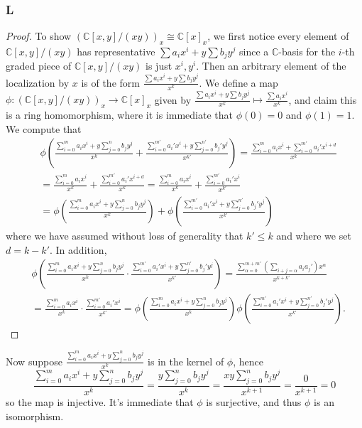 \documentclass{article}
\newcommand{\C}{\mathbb{C}}
\begin{document}
\subsubsection{L}\label{3.2.L}
\begin{proof}
    To show $(\C[x,y]/(xy))_x\cong \C[x]_x$, we first notice every element of $\C[x,y]/(xy)$ has representative $\sum a_i x^i+ y \sum b_j y^j$ since a $\C$-basis for the $i$-th graded piece of $\C[x,y]/(xy)$ is just $x^i,y^i$. Then an arbitrary element of the localization by $x$ is of the form $\frac{\sum a_i x^i+ y \sum b_j y^j}{x^k}$. We define a map $\phi:(\C[x,y]/(xy))_x\to \C[x]_x$ given by $\frac{\sum a_i x^i+ y \sum b_j y^j}{x^k}\mapsto \frac{\sum a_i x^i}{x^k}$, and claim this is a ring homomorphism, where it is immediate that $\phi(0)=0$ and $\phi(1)=1$. We compute that
    \begin{align*}
        &\phi(\frac{\sum_{i=0}^m a_i x^i+ y \sum_{j=0}^n b_j y^j}{x^k}+\frac{\sum_{i=0}^{m'} a_i' x^i+ y \sum_{j=0}^{n'} b_j' y^j}{x^{k'}})=\frac{\sum_{i=0}^m a_i x^i+\sum_{i=0}^{m'}a_i'x^{i+d}}{x^k}\\
        &=\frac{\sum_{i=0}^m a_i x^i}{x^k}+\frac{\sum_{i=0}^{m'}a_i'x^{i+d}}{x^k}=\frac{\sum_{i=0}^m a_i x^i}{x^k}+\frac{\sum_{i=0}^{m'}a_i'x^{i}}{x^{k'}}\\
        &=\phi(\frac{\sum_{i=0}^m a_i x^i+ y \sum_{j=0}^n b_j y^j}{x^k})+\phi(\frac{\sum_{i=0}^{m'} a_i' x^i+ y \sum_{j=0}^{n'} b_j' y^j}{x^{k'}})
    \end{align*}
    where we have assumed without loss of generality that $k'\le k$ and where we set $d=k-k'$. In addition,
    \begin{align*}
        &\phi(\frac{\sum_{i=0}^m a_i x^i+ y \sum_{j=0}^n b_j y^j}{x^k} \cdot \frac{\sum_{i=0}^{m'} a_i' x^i+ y \sum_{j=0}^{n'} b_j' y^j}{x^{k'}})=\frac{\sum_{\alpha=0}^{m+m'} (\sum_{i+j=\alpha} a_ia_j')x^\alpha}{x^{k+k'}}\\
        &=\frac{\sum_{i=0}^m a_i x^i}{x^k} \cdot \frac{\sum_{i=0}^{m'} a_i' x^i}{x^{k'}}=\phi(\frac{\sum_{i=0}^m a_i x^i+ y \sum_{j=0}^n b_j y^j}{x^k})\phi( \frac{\sum_{i=0}^{m'} a_i' x^i+ y \sum_{j=0}^{n'} b_j' y^j}{x^{k'}}).
    \end{align*}
\end{proof}
Now suppose $\frac{\sum_{i=0}^m a_i x^i+ y \sum_{j=0}^n b_j y^j}{x^k}$ is in the kernel of $\phi$, hence
\[
\frac{\sum_{i=0}^m a_i x^i+ y \sum_{j=0}^n b_j y^j}{x^k}=\frac{y \sum_{j=0}^n b_j y^j}{x^k} = \frac{xy \sum_{j=0}^n b_j y^j}{x^{k+1}}=\frac{0}{x^{k+1}}=0
\]
so the map is injective. It's immediate that $\phi$ is surjective, and thus $\phi$ is an isomorphism.
\end{document}
